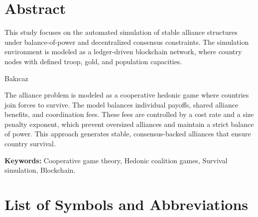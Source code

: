 \chapter*{Abstract}

This study focuses on the automated simulation of stable alliance structures under balance-of-power and decentralized consensus constraints. The simulation environment is modeled as a ledger-driven blockchain network, where country nodes with defined troop, gold, and population capacities. 

Bakıcaz

The alliance problem is modeled as a cooperative hedonic game where countries join forces to survive. The model balances individual payoffs, shared alliance benefits, and coordination fees. These fees are controlled by a cost rate and a size penalty exponent, which prevent oversized alliances and maintain a strict balance of power. This approach generates stable, consensus-backed alliances that ensure country survival.

\vfill
\textbf{Keywords:} Cooperative game theory, Hedonic coalition games, Survival simulation, Blockchain.
\clearpage

\chapter*{List of Symbols and Abbreviations}

